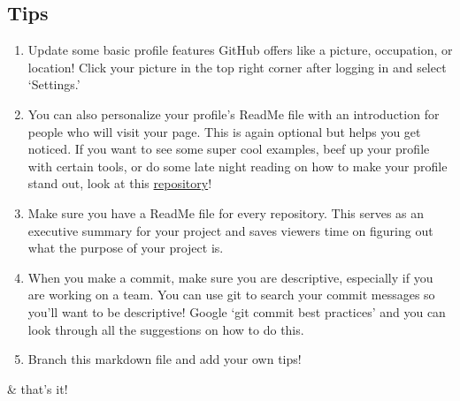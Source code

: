 \documentclass[
]{article}
\providecommand{\tightlist}{%
  \setlength{\itemsep}{0pt}\setlength{\parskip}{0pt}}
\begin{document}
\hypertarget{tips}{%
\subsection{Tips}\label{tips}}

\begin{enumerate}
\def\labelenumi{\arabic{enumi}.}
\tightlist
\item
  Update some basic profile features GitHub offers like a picture,
  occupation, or location! Click your picture in the top right corner
  after logging in and select `Settings.'
\item
  You can also personalize your profile's ReadMe file with an
  introduction for people who will visit your page. This is again
  optional but helps you get noticed. If you want to see some super cool
  examples, beef up your profile with certain tools, or do some late
  night reading on how to make your profile stand out, look at this
  \href{https://github.com/abhisheknaiidu/awesome-github-profile-readme}{repository}!
\item
  Make sure you have a ReadMe file for every repository. This serves as
  an executive summary for your project and saves viewers time on
  figuring out what the purpose of your project is.
\item
  When you make a commit, make sure you are descriptive, especially if
  you are working on a team. You can use git to search your commit
  messages so you'll want to be descriptive! Google `git commit best
  practices' and you can look through all the suggestions on how to do
  this.
\item
  Branch this markdown file and add your own tips!
\end{enumerate}

\& that's it!
\end{document}
